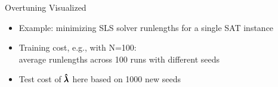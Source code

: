 \begin{frame}[fragile]{Overtuning Visualized}

\begin{itemize}
	\item Example: minimizing SLS solver runlengths for a single SAT instance
	\item \alert{Training cost}, e.g., with N=100:\\average runlengths across 100 runs with different seeds
	\item \alert{Test cost} of $\pmb{\hat{\lambda}}$ here based on 1000 new seeds 
\end{itemize}	

\pause


\begin{center}
\end{center}


\end{frame}

